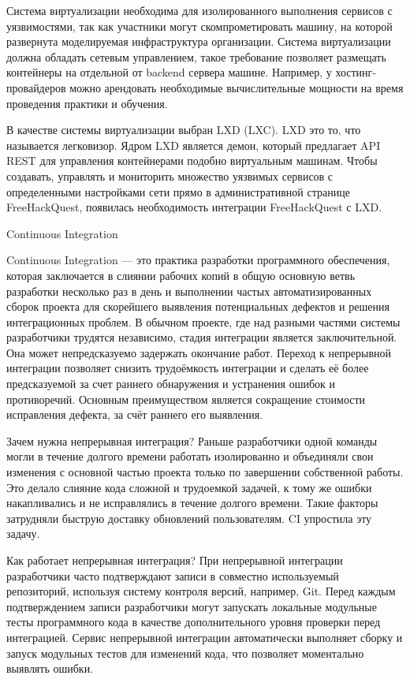 Система виртуализации необходима для изолированного выполнения сервисов с уязвимостями, так как участники могут скомпрометировать машину, на которой развернута моделируемая инфраструктура организации. Система виртуализации должна обладать сетевым управлением, такое требование позволяет размещать контейнеры на отдельной от backend сервера машине. Например, у хостинг-провайдеров можно арендовать необходимые вычислительные мощности на время проведения практики и обучения.\par
В качестве системы виртуализации выбран LXD (LXC). LXD это то, что называется легковизор. Ядром LXD является демон, который предлагает API REST для управления контейнерами подобно виртуальным машинам. Чтобы создавать, управлять и мониторить множество уязвимых сервисов с определенными настройками сети прямо в административной странице FreeHackQuest, появилась необходимость интеграции FreeHackQuest с LXD.\par

\begin{center}
Continuous Integration
\end{center}

Continuous Integration — это практика разработки программного обеспечения, которая заключается в слиянии рабочих копий в общую основную ветвь разработки несколько раз в день и выполнении частых автоматизированных сборок проекта для скорейшего выявления потенциальных дефектов и решения интеграционных проблем. В обычном проекте, где над разными частями системы разработчики трудятся независимо, стадия интеграции является заключительной. Она может непредсказуемо задержать окончание работ. Переход к непрерывной интеграции позволяет снизить трудоёмкость интеграции и сделать её более предсказуемой за счет раннего обнаружения и устранения ошибок и противоречий. Основным преимуществом является сокращение стоимости исправления дефекта, за счёт раннего его выявления. \par
Зачем нужна непрерывная интеграция? Раньше разработчики одной команды могли в течение долгого времени работать изолированно и объединяли свои изменения с основной частью проекта только по завершении собственной работы. Это делало слияние кода сложной и трудоемкой задачей, к тому же ошибки накапливались и не исправлялись в течение долгого времени. Такие факторы затрудняли быструю доставку обновлений пользователям. CI упростила эту задачу. \par
Как работает непрерывная интеграция? При непрерывной интеграции разработчики часто подтверждают записи в совместно используемый репозиторий, используя систему контроля версий, например, Git. Перед каждым подтверждением записи разработчики могут запускать локальные модульные тесты программного кода в качестве дополнительного уровня проверки перед интеграцией. Сервис непрерывной интеграции автоматически выполняет сборку и запуск модульных тестов для изменений кода, что позволяет моментально выявлять ошибки. \par

